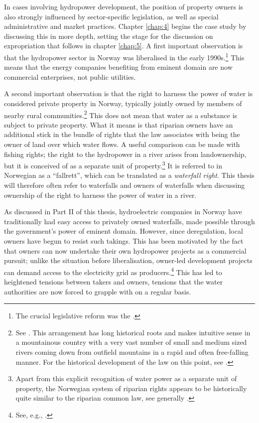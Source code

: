 In cases involving hydropower development, the position of property owners is also strongly influenced by sector-specific legislation, as well as special administrative and market practices. Chapter \ref{chap:4} begins the case study by discussing this in more depth, setting the stage for the discussion on expropriation that follows in chapter \ref{chap:5}. A first important observation is that the hydropower sector in Norway was liberalised in the early 1990s.\footnote{The crucial legislative reform was the \cite{ea90}.} This means that the energy companies benefiting from eminent domain are now commercial enterprises, not public utilities.

A second important observation is that the right to harness the power of water is considered private property in Norway, typically jointly owned by members of nearby rural communities.\footnote{See \dni\cite[13]{wra00}. This arrangement has long historical roots and makes intuitive sense in a mountainous country with a very vast number of small and medium sized rivers coming down from outfield mountains in a rapid and often free-falling manner. For the historical development of the law on this point, see \cite[109-116]{nordtveit15}.} This does not mean that water as a substance is subject to private property. What it means is that riparian owners have an additional stick in the bundle of rights that the law associates with being the owner of land over which water flows. A useful comparison can be made with fishing rights; the right to the hydropower in a river arises from landownership, but it is conceived of as a separate unit of property.\footnote{Apart from this explicit recognition of water power as a separate unit of property, the Norwegian system of riparian rights appears to be historically quite similar to the riparian common law, see generally \cite{howarth15}.} It is referred to in Norwegian as a ``fallrett'', which can be translated as a {\it waterfall right}. This thesis will therefore often refer to waterfalls and owners of waterfalls when discussing ownership of the right to harness the power of water in a river.

As discussed in Part II of this thesis, hydroelectric companies in Norway have traditionally had easy access to privately owned waterfalls, made possible through the government's power of eminent domain. However, since deregulation, local owners have begun to resist such takings. This has been motivated by the fact that owners can now undertake their own hydropower projects as a commercial pursuit; unlike the situation before liberalisation, owner-led development projects can demand access to the electricity grid as producers.\footnote{See, e.g., \cite{uleberg08}.} This has led to heightened tensions between takers and owners, tensions that the water authorities are now forced to grapple with on a regular basis.

